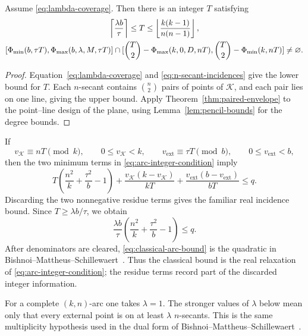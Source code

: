 \begin{corollary}
\label{cor:n-secant-feasibility}
Assume \eqref{eq:lambda-coverage}.  Then there is an integer \(T\) satisfying
\begin{gather}
 \left\lceil\frac{\lambda b}{\tau}\right\rceil
 \le T\le
 \left\lfloor\frac{k(k-1)}{n(n-1)}\right\rfloor,
 \label{eq:T-range}\\
 [\Phimin(b,\tau T),\Phimax(b,\lambda,M,\tau T)]
 \cap
 [\binom T2-\Phimax(k,0,D,nT),
  \binom T2-\Phimin(k,nT)]\ne\varnothing.
 \label{eq:arc-integer-condition}
\end{gather}
\end{corollary}

\begin{proof}
Equation~\eqref{eq:lambda-coverage} and
\eqref{eq:n-secant-incidences} give the lower bound for \(T\).  Each
\(n\)-secant contains \(\binom n2\) pairs of points of \(\mathcal K\), and
each pair lies on one line, giving the upper bound.  Apply
Theorem~\ref{thm:paired-envelope} to the point--line design of the plane,
using Lemma~\ref{lem:pencil-bounds} for the degree bounds.
\end{proof}

If
\[
 v_{\mathcal K}\equiv nT\pmod k,\qquad 0\le v_{\mathcal K}<k,
 \qquad
 v_{\mathrm{ext}}\equiv\tau T\pmod b,\qquad 0\le v_{\mathrm{ext}}<b,
\]
then the two minimum terms in \eqref{eq:arc-integer-condition} imply
\begin{equation}\label{eq:integer-incidence-bound}
 T\left(\frac{n^2}{k}+\frac{\tau^2}{b}-1\right)
 +\frac{v_{\mathcal K}(k-v_{\mathcal K})}{kT}
 +\frac{v_{\mathrm{ext}}(b-v_{\mathrm{ext}})}{bT}
 \le q.
\end{equation}
Discarding the two nonnegative residue terms gives the familiar real
incidence bound.  Since \(T\ge\lambda b/\tau\), we obtain
\begin{equation}\label{eq:classical-arc-bound}
 \frac{\lambda b}{\tau}
 \left(\frac{n^2}{k}+\frac{\tau^2}{b}-1\right)\le q.
\end{equation}
After denominators are cleared, \eqref{eq:classical-arc-bound} is the
quadratic in Bishnoi--Mattheus--Schillewaert~\cite[Theorem~8.1]{BMS}.
Thus the classical bound is the real relaxation of
\eqref{eq:arc-integer-condition}; the residue terms record part of the
discarded integer information.

\begin{remark}\label{rem:ordinary-completeness}
For a complete \((k,n)\)-arc one takes \(\lambda=1\).  The stronger values of
\(\lambda\) below mean only that every external point is on at least
\(\lambda\) \(n\)-secants.  This is the same multiplicity hypothesis used in
the dual form of Bishnoi--Mattheus--Schillewaert~\cite[Theorem~8.1]{BMS}.
\end{remark}
